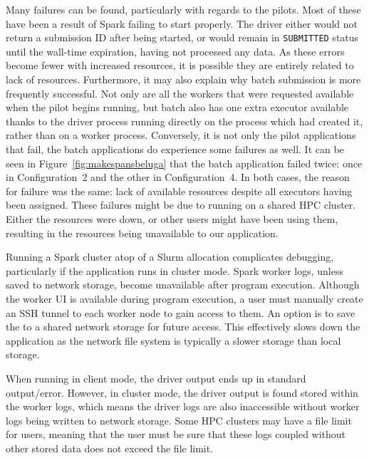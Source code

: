 \documentclass{IEEEtran}
\begin{document}
Many failures can be found, particularly with regards to the pilots. Most
of these have been a result of Spark failing to start properly. The driver
either would not return a submission ID after being started, or would
remain in \texttt{SUBMITTED} status until the wall-time expiration, having
not processed any data. As these errors become fewer with increased
resources, it is possible they are entirely related to lack of resources.
Furthermore, it may also explain why batch submission is more frequently successful. Not
only are all the workers that were requested available when the pilot
begins running, but batch also has one extra executor available thanks to the driver
process running directly on the process which had created it, rather than on a
worker process. Conversely, it is not only the pilot applications that
fail, the batch applications do experience some failures as well. It can be
seen in Figure~\ref{fig:makespansbeluga} that the batch application failed
twice: once in Configuration~2 and the other in Configuration~4. In both
cases, the reason for failure was the same: lack of available resources
despite all executors having been assigned. These failures might be due to
running on a shared HPC cluster. Either the resources were down, or other users might
have been using them, resulting in the resources being unavailable to our
application.

Running a Spark cluster atop of a Slurm allocation complicates debugging, particularly if the application runs in cluster mode.
Spark worker logs, unless saved to network storage, become unavailable after program execution.
Although the worker UI is available during program execution, a user must manually create an SSH tunnel
to each worker node to gain access to them.
An option is to save the to a shared network storage for future access. This effectively slows down
the application as the network file system is typically a slower storage than local storage.

When running in client mode, the driver output ends up in standard output/error. 
However, in cluster mode, the driver output is found stored within
the worker logs, which means the driver logs are also inaccessible without 
worker logs being written to network storage. Some HPC clusters
may have a file limit for users, meaning that the user must be sure that these 
logs coupled without other stored data does not exceed the file
limit.  
\end{document}
